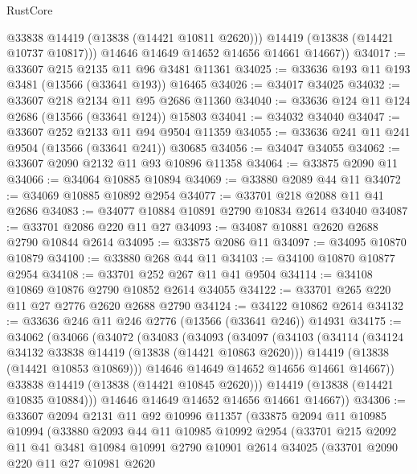 \begin{lexlean}{RustCore}
\begin{coremodule}
            @33838
            @14419
            (@13838 (@14421 @10811 @2620)))
          @14419
          (@13838 (@14421 @10737 @10817)))
        @14646
        @14649
        @14652
        @14656
        @14661
        @14667))
@34017 := @33607 @215 @2135 @11 @96 @3481 @11361
@34025 := @33636 @193 @11 @193 @3481 (@13566 (@33641 @193)) @16465
@34026 := @34017 @34025
@34032 := @33607 @218 @2134 @11 @95 @2686 @11360
@34040 := @33636 @124 @11 @124 @2686 (@13566 (@33641 @124)) @15803
@34041 := @34032 @34040
@34047 := @33607 @252 @2133 @11 @94 @9504 @11359
@34055 := @33636 @241 @11 @241 @9504 (@13566 (@33641 @241)) @30685
@34056 := @34047 @34055
@34062 := @33607 @2090 @2132 @11 @93 @10896 @11358
@34064 := @33875 @2090 @11
@34066 := @34064 @10885 @10894
@34069 := @33880 @2089 @44 @11
@34072 := @34069 @10885 @10892 @2954
@34077 := @33701 @218 @2088 @11 @41 @2686
@34083 := @34077 @10884 @10891 @2790 @10834 @2614 @34040
@34087 := @33701 @2086 @220 @11 @27
@34093 := @34087 @10881 @2620 @2688 @2790 @10844 @2614
@34095 := @33875 @2086 @11
@34097 := @34095 @10870 @10879
@34100 := @33880 @268 @44 @11
@34103 := @34100 @10870 @10877 @2954
@34108 := @33701 @252 @267 @11 @41 @9504
@34114 := @34108 @10869 @10876 @2790 @10852 @2614 @34055
@34122 := @33701 @265 @220 @11 @27 @2776 @2620 @2688 @2790
@34124 := @34122 @10862 @2614
@34132 := @33636 @246 @11 @246 @2776 (@13566 (@33641 @246)) @14931
@34175 := @34062
    (@34066
      (@34072
        (@34083
          (@34093
            (@34097
              (@34103
                (@34114
                  (@34124 @34132 @33838 @14419 (@13838 (@14421 @10863 @2620)))
                  @14419
                  (@13838 (@14421 @10853 @10869)))
                @14646
                @14649
                @14652
                @14656
                @14661
                @14667))
            @33838
            @14419
            (@13838 (@14421 @10845 @2620)))
          @14419
          (@13838 (@14421 @10835 @10884)))
        @14646
        @14649
        @14652
        @14656
        @14661
        @14667))
@34306 := @33607
    @2094
    @2131
    @11
    @92
    @10996
    @11357
    (@33875
      @2094
      @11
      @10985
      @10994
      (@33880
        @2093
        @44
        @11
        @10985
        @10992
        @2954
        (@33701
          @215
          @2092
          @11
          @41
          @3481
          @10984
          @10991
          @2790
          @10901
          @2614
          @34025
          (@33701
            @2090
            @220
            @11
            @27
            @10981
            @2620

\end{coremodule}
\end{lexlean}
